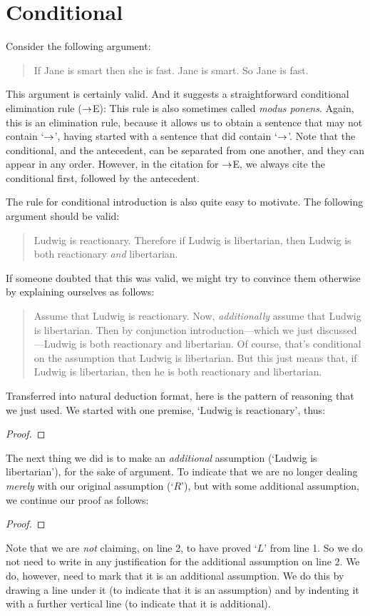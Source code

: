 \section{Conditional}
Consider the following argument:
	\begin{quote}
		If Jane is smart then she is fast. Jane is smart. So Jane is fast.
	\end{quote}
This argument is certainly valid. And it suggests a straightforward conditional elimination rule ($\rightarrow$E):
This rule is also sometimes called \emph{modus ponens}. Again, this is an elimination rule, because it allows us to obtain a sentence that may not contain `$\rightarrow$', having started with a sentence that did contain `$\rightarrow$'. Note that the conditional, and the antecedent, can be separated from one another, and they can appear in any order. However, in the citation for $\rightarrow$E, we always cite the conditional first, followed by the antecedent.

The rule for conditional introduction is also quite easy to motivate. The following argument should be valid:
	\begin{quote}
		Ludwig is reactionary. Therefore if Ludwig is libertarian, then Ludwig is both reactionary \emph{and} libertarian.
	\end{quote}
If someone doubted that this was valid, we might try to convince them otherwise by explaining ourselves as follows:
	\begin{quote}
		Assume that Ludwig is reactionary. Now, \emph{additionally} assume that Ludwig is libertarian. Then by conjunction introduction---which we just discussed---Ludwig is both reactionary and libertarian. Of course, that's conditional on the assumption that Ludwig is libertarian. But this just means that, if Ludwig is libertarian, then he is both reactionary and libertarian.
	\end{quote}
Transferred into natural deduction format, here is the pattern of reasoning that we just used. We started with one premise, `Ludwig is reactionary', thus:
	\begin{proof}
	\end{proof}
The next thing we did is to make an \emph{additional} assumption (`Ludwig is libertarian'), for the sake of argument. To indicate that we are no longer dealing \emph{merely} with our original assumption (`$R$'), but with some additional assumption, we continue our proof as follows:
	\begin{proof}
		\open
	\end{proof}
Note that we are \emph{not} claiming, on line 2, to have proved `$L$' from line 1. So we do not need to write in any justification for the additional assumption on line 2. We do, however, need to mark that it is an additional assumption. We do this by drawing a line under it (to indicate that it is an assumption) and by indenting it with a further vertical line (to indicate that it is additional). 


